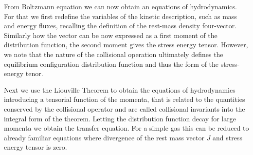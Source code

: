 From Boltzmann equation we can now obtain an equations of hydrodynamics. For that we first redefine the variables of the kinetic description, such as mass and energy fluxes, recalling the definition of the rest-mass density four-vector. 
Similarly how the vector can be now expressed as a first moment of the distribution function, the second moment gives the stress energy tensor. However, we note that the nature of the collisional operation ultimately defines the equilibrium configuration distribution function and thus the form of the stress-energy tenor.

Next we use the Liouville Theorem to obtain the equations of hydrodynamics introducing a tensorial function of the momenta, that is related to the quantities conserved by the collisional operator and are called collisional invariants into the integral form of the theorem. 
Letting the distribution function decay for large momenta we obtain the transfer equation. 
For a simple gas this can be reduced to already familiar equations where divergence of the rest mass vector $J$ and stress energy tensor is zero.
